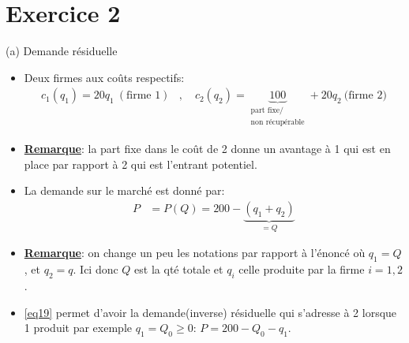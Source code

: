 \section{Exercice 2}
\frame{\sectionpage}
\begin{frame}[allowframebreaks]{(a) Demande résiduelle}
\begin{itemize}
    \item Deux firmes aux coûts respectifs: 
    \begin{align}
     c_1(q_1) = 20q_1 \ (\text{firme 1}) 
     &,  \quad c_2(q_2) = 
     \underbrace{100}_{\substack{\text{part fixe/}\\\text{non récupérable}}} + 20q_2 \ \text{(firme 2)}
     \label{eq18}
    \end{align}
    \item \textbf{\underline{Remarque}}: la part fixe dans le coût de 2 donne un avantage 
    à 1 qui est en place par rapport à 2 qui est l'entrant potentiel.
    \item La demande sur le marché est donné par: 
    \begin{align}
        P&= P(Q) = 200 - \underbrace{(q_1 + q_2)}_{= Q}
        \label{eq19}
    \end{align}
    \item \textbf{\underline{Remarque}}: on change un peu les notations par rapport à l'énoncé où $q_1=Q$, et $q_2 = q$. Ici donc  
    $Q$ est la qté totale et $q_i$ celle produite par la firme $i=1, 2$.
    \item \eqref{eq19} permet d'avoir la demande(inverse) résiduelle qui s'adresse à 2 lorsque 1 produit par exemple $q_1=Q_0\geq 0$: $P=200-Q_0-q_1$.
\end{itemize}
\end{frame}
